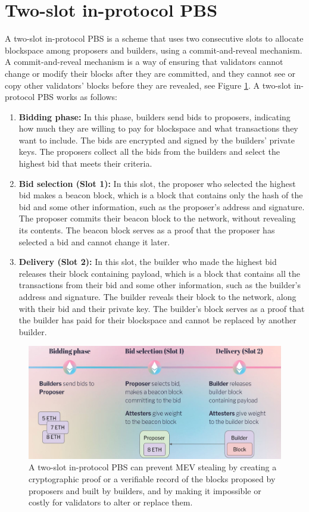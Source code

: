 \documentclass{report}
\begin{document}
\section{Two-slot in-protocol PBS}
A two-slot in-protocol PBS is a scheme that uses two consecutive slots to allocate blockspace among proposers and builders, using a commit-and-reveal mechanism. A commit-and-reveal mechanism is a way of ensuring that validators cannot change or modify their blocks after they are committed, and they cannot see or copy other validators’ blocks before they are revealed, see Figure \ref{fig:f5}. A two-slot in-protocol PBS works as follows:
\begin{enumerate}
	\item \textbf{Bidding phase:} In this phase, builders send bids to proposers, indicating how much they are willing to pay for blockspace and what transactions they want to include. The bids are encrypted and signed by the builders’ private keys. The proposers collect all the bids from the builders and select the highest bid that meets their criteria.
	\item \textbf{Bid selection (Slot 1):} In this slot, the proposer who selected the highest bid makes a beacon block, which is a block that contains only the hash of the bid and some other information, such as the proposer’s address and signature. The proposer commits their beacon block to the network, without revealing its contents. The beacon block serves as a proof that the proposer has selected a bid and cannot change it later.
	\item \textbf{Delivery (Slot 2):} In this slot, the builder who made the highest bid releases their block containing payload, which is a block that contains all the transactions from their bid and some other information, such as the builder’s address and signature. The builder reveals their block to the network, along with their bid and their private key. The builder’s block serves as a proof that the builder has paid for their blockspace and cannot be replaced by another builder.
\end{enumerate}
\begin{center}
	\begin{figure}
		\centering
		\includegraphics[width=1\linewidth]{Fig/F5}
		\caption{A two-slot in-protocol PBS can prevent MEV stealing by creating a cryptographic proof or a verifiable record of the blocks proposed by proposers and built by builders, and by making it impossible or costly for validators to alter or replace them.}
		\label{fig:f5}
	\end{figure}
\end{center}
\end{document}
